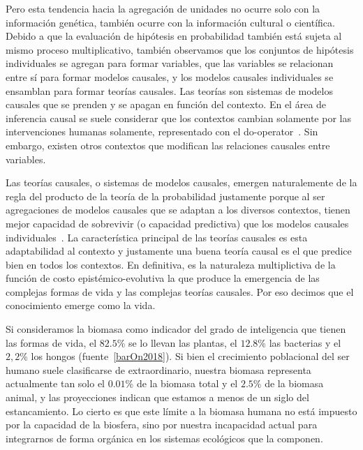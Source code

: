 \documentclass[a4paper,11pt]{book}
\theoremstyle{definition}
\begin{document}

Pero esta tendencia hacia la agregación de unidades no ocurre solo con la información genética, también ocurre con la información cultural o científica.
%
Debido a que la evaluación de hipótesis en probabilidad también está sujeta al mismo proceso multiplicativo, también observamos que los conjuntos de hipótesis individuales se agregan para formar variables, que las variables se relacionan entre sí para formar modelos causales, y los modelos causales individuales se ensamblan para formar teorías causales.
%
Las teorías son sistemas de modelos causales que se prenden y se apagan en función del contexto.
%
En el área de inferencia causal se suele considerar que los contextos cambian solamente por las intervenciones humanas solamente, representado con el do-operator~\cite{pearl2009-causality}.
%
Sin embargo, existen otros contextos que modifican las relaciones causales entre variables.


Las teorías causales, o sistemas de modelos causales, emergen naturalemente de la regla del producto de la teoría de la probabilidad justamente porque al ser agregaciones de modelos causales que se adaptan a los diversos contextos, tienen mejor capacidad de sobrevivir (o capacidad predictiva) que los modelos causales individuales~\cite{winn2012-causality,minka2008-gates}.
%
La característica principal de las teorías causales es esta adaptabilidad al contexto y justamente una buena teoría causal es el que predice bien en todos los contextos.
%
En definitiva, es la naturaleza multiplictiva de la función de costo epistémico-evolutiva la que produce la emergencia de las complejas formas de vida y las complejas teorías causales.
%
Por eso decimos que el conocimiento emerge como la vida.


Si consideramos la biomasa como indicador del grado de inteligencia que tienen las formas de vida, el $82.5$\% se lo llevan las plantas, el $12.8$\% las bacterias y el $2,2$\% los hongos (fuente~\ref{barOn2018}).
%
Si bien el crecimiento poblacional del ser humano suele clasificarse de extraordinario, nuestra biomasa representa actualmente tan solo el $0.01$\% de la biomasa total y el $2.5$\% de la biomasa animal, y las proyecciones indican que estamos a menos de un siglo del estancamiento.
%
Lo cierto es que este límite a la biomasa humana no está impuesto por la capacidad de la biosfera, sino por nuestra incapacidad actual para integrarnos de forma orgánica en los sistemas ecológicos que la componen.
\end{document}
